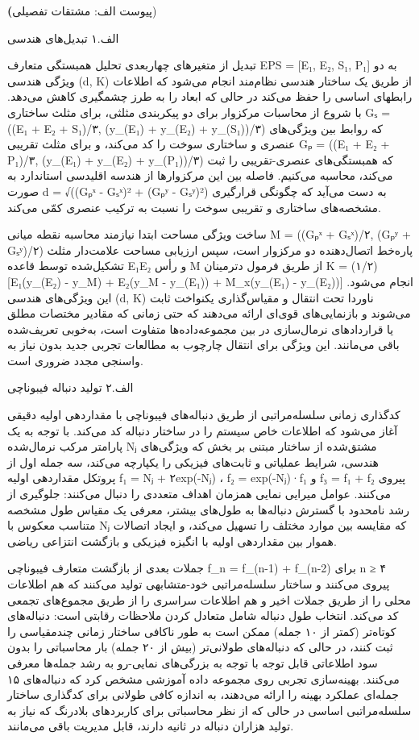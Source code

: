 \documentclass[12pt, a4paper]{article}
\begin{document}
\textbf(پیوست الف: مشتقات تفصیلی)

الف.۱ تبدیل‌های هندسی

تبدیل از متغیرهای چهاربعدی تحلیل همبستگی متعارف EPS = [E₁, E₂, S₁, P₁] به دو ویژگی هندسی (d, K) از طریق یک ساختار هندسی نظام‌مند انجام می‌شود که اطلاعات رابطهای اساسی را حفظ می‌کند در حالی که ابعاد را به طرز چشمگیری کاهش می‌دهد. با شروع از محاسبات مرکزوار برای دو پیکربندی مثلثی، برای مثلث ساختاری Gₛ = ((E₁ + E₂ + S₁)/۳, (y\_(E₁) + y\_(E₂) + y\_(S₁))/۳) که روابط بین ویژگی‌های عنصری و ساختاری سوخت را کد می‌کند، و برای مثلث تقریبی Gₚ = ((E₁ + E₂ + P₁)/۳, (y\_(E₁) + y\_(E₂) + y\_(P₁))/۳) که همبستگی‌های عنصری-تقریبی را ثبت می‌کند، محاسبه می‌کنیم. فاصله بین این مرکزوارها از هندسه اقلیدسی استاندارد به صورت d = √((Gₚˣ - Gₛˣ)² + (Gₚʸ - Gₛʸ)²) به دست می‌آید که چگونگی قرارگیری مشخصه‌های ساختاری و تقریبی سوخت را نسبت به ترکیب عنصری کمّی می‌کند.

ساخت ویژگی مساحت ابتدا نیازمند محاسبه نقطه میانی M = ((Gₚˣ + Gₛˣ)/۲, (Gₚʸ + Gₛʸ)/۲) پاره‌خط اتصال‌دهنده دو مرکزوار است، سپس ارزیابی مساحت علامت‌دار مثلث تشکیل‌شده توسط قاعده E₁E₂ و رأس M از طریق فرمول دترمینان K = (۱/۲)[E₁(y\_(E₂) - y\_M) + E₂(y\_M - y\_(E₁)) + M\_x(y\_(E₁) - y\_(E₂))] انجام می‌شود. این ویژگی‌های هندسی (d, K) ناوردا تحت انتقال و مقیاس‌گذاری یکنواخت ثابت می‌شوند و بازنمایی‌های قوی‌ای ارائه می‌دهند که حتی زمانی که مقادیر مختصات مطلق یا قراردادهای نرمال‌سازی در بین مجموعه‌داده‌ها متفاوت است، به‌خوبی تعریف‌شده باقی می‌مانند. این ویژگی برای انتقال چارچوب به مطالعات تجربی جدید بدون نیاز به واسنجی مجدد ضروری است.

الف.۲ تولید دنباله فیبوناچی

کدگذاری زمانی سلسله‌مراتبی از طریق دنباله‌های فیبوناچی با مقداردهی اولیه دقیقی آغاز می‌شود که اطلاعات خاص سیستم را در ساختار دنباله کد می‌کند. با توجه به یک پارامتر مرکب نرمال‌شده Nⱼ مشتق‌شده از ساختار مبتنی بر بخش که ویژگی‌های هندسی، شرایط عملیاتی و ثابت‌های فیزیکی را یکپارچه می‌کند، سه جمله اول از پروتکل مقداردهی اولیه f₁ = Nⱼ + ۲exp(-Nⱼ) ، f₂ = exp(-Nⱼ)·f₁ و f₃ = f₁ + f₂ پیروی می‌کنند. عوامل میرایی نمایی همزمان اهداف متعددی را دنبال می‌کنند: جلوگیری از رشد نامحدود با گسترش دنباله‌ها به طول‌های بیشتر، معرفی یک مقیاس طول مشخصه متناسب معکوس با Nⱼ که مقایسه بین موارد مختلف را تسهیل می‌کند، و ایجاد اتصالات هموار بین مقداردهی اولیه با انگیزه فیزیکی و بازگشت انتزاعی ریاضی.

جملات بعدی از بازگشت متعارف فیبوناچی f\_n = f\_(n-1) + f\_(n-2) برای n ≥ ۴ پیروی می‌کنند و ساختار سلسله‌مراتبی خود-متشابهی تولید می‌کنند که هم اطلاعات محلی را از طریق جملات اخیر و هم اطلاعات سراسری را از طریق مجموع‌های تجمعی کد می‌کند. انتخاب طول دنباله شامل متعادل کردن ملاحظات رقابتی است: دنباله‌های کوتاه‌تر (کمتر از ۱۰ جمله) ممکن است به طور ناکافی ساختار زمانی چندمقیاسی را ثبت کنند، در حالی که دنباله‌های طولانی‌تر (بیش از ۲۰ جمله) بار محاسباتی را بدون سود اطلاعاتی قابل توجه با توجه به بزرگی‌های نمایی-رو به رشد جمله‌ها معرفی می‌کنند. بهینه‌سازی تجربی روی مجموعه داده آموزشی مشخص کرد که دنباله‌های ۱۵ جمله‌ای عملکرد بهینه را ارائه می‌دهند، به اندازه کافی طولانی برای کدگذاری ساختار سلسله‌مراتبی اساسی در حالی که از نظر محاسباتی برای کاربردهای بلادرنگ که نیاز به تولید هزاران دنباله در ثانیه دارند، قابل مدیریت باقی می‌مانند.
\end{document}
